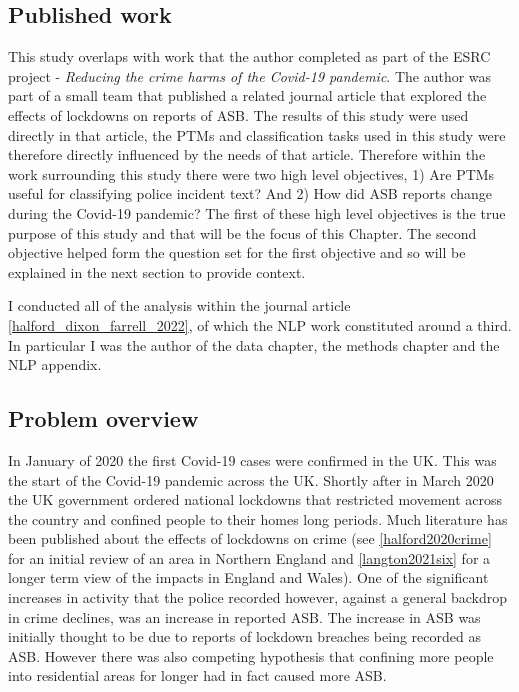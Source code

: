 
 \subsection{Published work} This study overlaps with work that the author completed as part of the ESRC project - \emph{Reducing the crime harms of the Covid-19 pandemic}. The author was part of a small team that published a related journal article \textcite{halford_dixon_farrell_2022} that explored the effects of lockdowns on reports of ASB. The results of this study were used directly in that article, the PTMs and classification tasks used in this study were therefore directly influenced by the needs of that article. Therefore within the work surrounding this study there were two high level objectives, 1) Are PTMs useful for classifying police incident text? And 2) How did ASB reports change during the Covid-19 pandemic? The first of these high level objectives is the true purpose of this study and that will be the focus of this Chapter. The second objective helped form the question set for the first objective and so will be explained in the next section to provide context. 

I conducted all of the analysis within the journal article \ref{halford_dixon_farrell_2022}, of which the NLP work constituted around a third. In particular I was the author of the data chapter, the methods chapter and the NLP appendix.

\subsection{Problem overview} In January of 2020 the first Covid-19 cases were confirmed in the UK. This was the start of the Covid-19 pandemic across the UK. Shortly after in March 2020 the UK government ordered national lockdowns that restricted movement across the country and confined people to their homes long periods. Much literature has been published about the effects of lockdowns on crime (see \ref{halford2020crime} for an initial review of an area in Northern England and \ref{langton2021six} for a longer term view of the impacts in England and Wales). One of the significant increases in activity that the police recorded however, against a general backdrop in crime declines, was an increase in reported ASB. The increase in ASB was initially thought to be due to reports of lockdown breaches being recorded as ASB. However there was also competing hypothesis that confining more people into residential areas for longer had in fact caused more ASB. 

